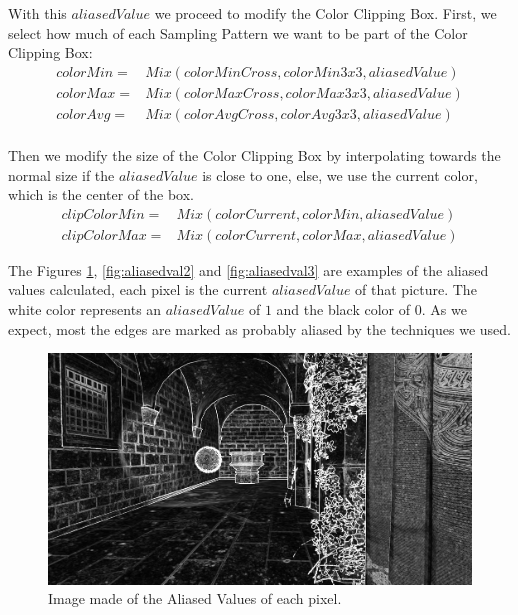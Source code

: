 \documentclass[pregrado]{tesis-usb} %
\begin{document}
With this $aliasedValue$ we proceed to modify the Color Clipping Box. First, we select how much of each Sampling Pattern we want to be part of the Color Clipping Box:
\begin{equation}\label{eq:newcolors}
\begin{split}
colorMin= & Mix(colorMinCross,colorMin3x3,aliasedValue) \\
colorMax= & Mix(colorMaxCross,colorMax3x3,aliasedValue) \\
colorAvg= & Mix(colorAvgCross,colorAvg3x3,aliasedValue) \\
\end{split}
\end{equation}

Then we modify the size of the Color Clipping Box by interpolating towards the normal size if the $aliasedValue$ is close to one, else, we use the current color, which is the center of the box.
\begin{equation}\label{eq:clipredux}
\begin{split}
	clipColorMin= & Mix(colorCurrent,colorMin,aliasedValue) \\
	clipColorMax= & Mix(colorCurrent,colorMax,aliasedValue)
\end{split}
\end{equation}



The Figures \ref{fig:aliasedval1}, \ref{fig:aliasedval2} and \ref{fig:aliasedval3} are examples of the aliased values calculated, each pixel is the current $aliasedValue$ of that picture. The white color represents an $aliasedValue$ of $1$ and the black color of $0$. As we expect, most the edges are marked as probably aliased by the techniques we used.

\begin{figure}[H]
	\centering
	\includegraphics[scale=0.2]{images/aliased_value_example_1_temporal.png}
	\caption{Image made of the Aliased Values of each pixel.}\label{fig:aliasedval1}
\end{figure}
\end{document}
